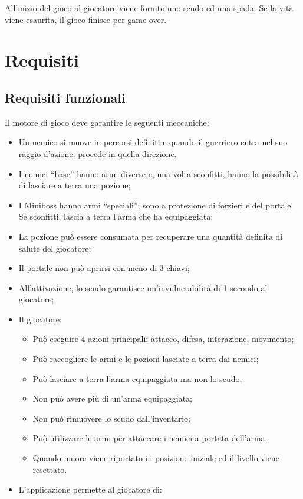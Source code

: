 \documentclass[a4paper, italian, 11pt, oneside]{report}
\begin{document}
All'inizio del gioco al giocatore viene fornito uno scudo ed una spada. Se la vita viene esaurita, il gioco finisce per game over.

\section{Requisiti}

\subsection{Requisiti funzionali}
Il motore di gioco deve garantire le seguenti meccaniche:
\begin{itemize}
  \item Un nemico si muove in percorsi definiti e quando il guerriero entra nel suo raggio d'azione, procede in quella direzione.
  \item I nemici ``base'' hanno armi diverse e, una volta sconfitti, hanno la possibilità di lasciare a terra una pozione;
  \item I Miniboss hanno armi ``speciali''; sono a protezione di forzieri e del portale. Se sconfitti, lascia a terra l'arma che ha equipaggiata;
  \item La pozione può essere consumata per recuperare una quantità definita di salute del giocatore;
  \item Il portale non può aprirsi con meno di 3 chiavi;
  \item All'attivazione, lo scudo garantisce un'invulnerabilità di 1 secondo al giocatore;
  \item Il giocatore:
  \begin{itemize}
    \item Può eseguire 4 azioni principali: attacco, difesa, interazione, movimento;
    \item Può raccogliere le armi e le pozioni lasciate a terra dai nemici;
    \item Può lasciare a terra l'arma equipaggiata ma non lo scudo;
    \item Non può avere più di un'arma equipaggiata;
    \item Non può rimuovere lo scudo dall'inventario;
    \item Può utilizzare le armi per attaccare i nemici a portata dell'arma.
    \item Quando muore viene riportato in posizione iniziale ed il livello viene resettato.
  \end{itemize}
  \item L'applicazione permette al giocatore di:

\end{itemize}
\end{document}
